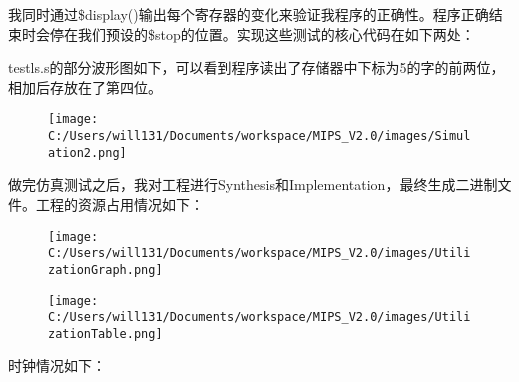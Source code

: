 \documentclass[]{article}
\newenvironment{Shaded}{}{}
\newcommand{\KeywordTok}[1]{\textcolor[rgb]{0.00,0.44,0.13}{\textbf{#1}}}
\newcommand{\DataTypeTok}[1]{\textcolor[rgb]{0.56,0.13,0.00}{#1}}
\newcommand{\DecValTok}[1]{\textcolor[rgb]{0.25,0.63,0.44}{#1}}
\newcommand{\StringTok}[1]{\textcolor[rgb]{0.25,0.44,0.63}{#1}}
\newcommand{\CommentTok}[1]{\textcolor[rgb]{0.38,0.63,0.69}{\textit{#1}}}
\newcommand{\NormalTok}[1]{#1}
\begin{document}
我同时通过\$display()输出每个寄存器的变化来验证我程序的正确性。程序正确结束时会停在我们预设的\$stop的位置。实现这些测试的核心代码在如下两处：

\begin{Shaded}
\end{Shaded}

testls.s的部分波形图如下，可以看到程序读出了存储器中下标为5的字的前两位，相加后存放在了第四位。

\begin{figure}
\centering
\texttt{[image: C:/Users/will131/Documents/workspace/MIPS\_V2.0/images/Simulation2.png]}
\caption{}
\end{figure}

做完仿真测试之后，我对工程进行Synthesis和Implementation，最终生成二进制文件。工程的资源占用情况如下：

\begin{figure}
\centering
\texttt{[image: C:/Users/will131/Documents/workspace/MIPS\_V2.0/images/UtilizationGraph.png]}
\caption{}
\end{figure}

\begin{figure}
\centering
\texttt{[image: C:/Users/will131/Documents/workspace/MIPS\_V2.0/images/UtilizationTable.png]}
\caption{}
\end{figure}

时钟情况如下：
\end{document}
